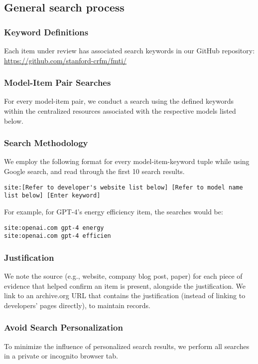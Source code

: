\documentclass[screen, authorversion, acmsmall]{acmart}
\begin{document}
\subsection{General search process}

\subsubsection{Keyword Definitions}
Each item under review has associated search keywords in our GitHub repository: \url{https://github.com/stanford-crfm/fmti/}

\subsubsection{Model-Item Pair Searches}
For every model-item pair, we conduct a search using the defined keywords within the centralized resources associated with the respective models listed below.

\subsubsection{Search Methodology}
We employ the following format for every model-item-keyword tuple while using Google search, and read through the first 10 search results.

\begin{lstlisting}[breaklines=true]
site:[Refer to developer's website list below] [Refer to model name list below] [Enter keyword]
\end{lstlisting}


\noindent
For example, for GPT-4's energy efficiency item, the searches would be:

\begin{lstlisting}
site:openai.com gpt-4 energy
site:openai.com gpt-4 efficien 
\end{lstlisting}

\subsubsection{Justification}
We note the source (e.g., website, company blog post, paper) for each piece of evidence that helped confirm an item is present, alongside the justification. We link to an archive.org URL that contains the justification (instead of linking to developers’ pages directly), to maintain records.

\subsubsection{Avoid Search Personalization}
To minimize the influence of personalized search results, we perform all searches in a private or incognito browser tab.
\end{document}
